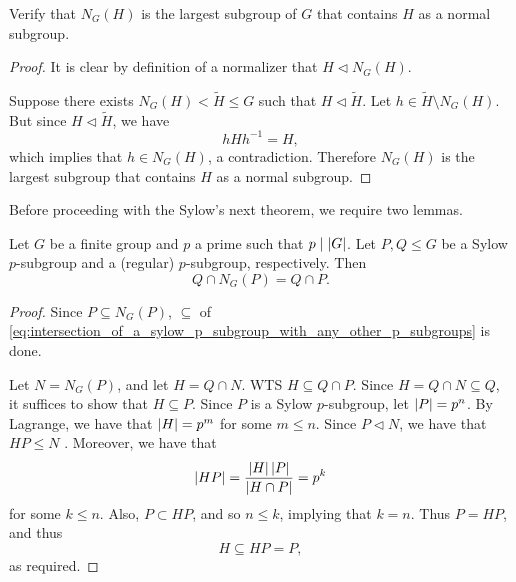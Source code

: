 \documentclass[notoc,notitlepage]{tufte-book}
\begin{document}
\begin{ex}
  Verify that $N_G(H)$ is the largest subgroup of $G$
  that contains $H$ as a normal subgroup.
\end{ex}

\begin{proof}
  It is clear by definition of a normalizer that $H \triangleleft N_G(H)$.

  Suppose there exists $N_G(H) < \tilde{H} \leq G$ such that
  $H \triangleleft \tilde{H}$. Let $h \in \tilde{H} \setminus N_G(H)$.
  But since $H \triangleleft \tilde{H}$, we have
  \begin{equation*}
    hHh^{-1} = H,
  \end{equation*}
  which implies that $h \in N_G(H)$, a contradiction.
  Therefore $N_G(H)$ is the largest subgroup that contains $H$ as a
  normal subgroup.
\end{proof}

Before proceeding with the Sylow's next theorem, we require two lemmas.

\begin{lemma}\label{lemma:intersection_of_a_sylow_p_subgroup_with_any_other_p_subgroups}
  Let $G$ be a finite group and $p$ a prime such that $p \mid \left|G\right|$.
  Let $P, Q \leq G$ be a Sylow $p$-subgroup and a (regular) $p$-subgroup,
  respectively. Then
  \begin{equation}\label{eq:intersection_of_a_sylow_p_subgroup_with_any_other_p_subgroups}
    Q \cap N_G(P) = Q \cap P.
  \end{equation}
\end{lemma}

\begin{proof}
  Since $P \subseteq N_G(P)$, $\subseteq$ of \cref{eq:intersection_of_a_sylow_p_subgroup_with_any_other_p_subgroups} is done.

  Let $N = N_G(P)$, and let $H = Q \cap N$. WTS $H \subseteq Q \cap P$.
  Since $H = Q \cap N \subseteq Q$, it suffices to show that $H \subseteq P$.
  Since $P$ is a Sylow $p$-subgroup, let $\left|P\right| = p^n$. By Lagrange,
  we have that $\left|H\right| = p^m$ for some $m \leq n$. Since $P \triangleleft N$,
  we have that $HP \leq N$ 
  .
  Moreover, we have that
  \begin{equation*}
    \left|HP\right| = \frac{\left|H\right|\left|P\right|}{\left|H \cap P\right|} = p^k
  \end{equation*}
  for some $k \leq n$. Also, $P \subset HP$, and so $n \leq k$,
  implying that $k = n$. Thus $P = HP$, and thus
  \begin{equation*}
    H \subseteq HP = P,
  \end{equation*}
  as required.
\end{proof}
\end{document}
